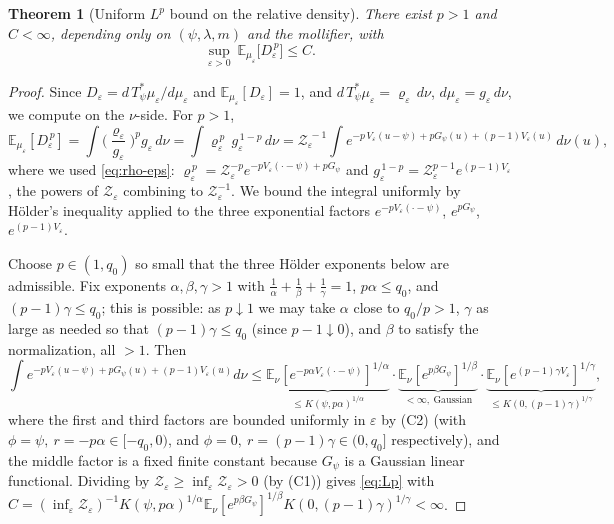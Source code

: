 \documentclass[12pt]{article}
\newcommand{\bE}{\mathbb{E}}
\newcommand{\eps}{\varepsilon}
\theoremstyle{plain}
\newtheorem{theorem}{Theorem}
\theoremstyle{definition}
\begin{document}
\begin{theorem}[Uniform $L^p$ bound on the relative density]\label{thm:Lp}
There exist $p>1$ and $C<\infty$, depending only on $(\psi,\lambda,m)$ and the
mollifier, with
\begin{equation}\label{eq:Lp}
\sup_{\eps>0}\ \bE_{\mu_\eps}\!\big[D_\eps^{\,p}\big]\le C .
\end{equation}
\end{theorem}

\begin{proof}
Since $D_\eps=d\,T_\psi^\ast\mu_\eps/d\mu_\eps$ and $\bE_{\mu_\eps}[D_\eps]=1$, and
$d\,T_\psi^\ast\mu_\eps=\varrho_\eps\,d\nu$, $d\mu_\eps=g_\eps\,d\nu$, we compute on the
$\nu$-side. For $p>1$,
\begin{equation}\label{eq:Lp-nu}
\bE_{\mu_\eps}[D_\eps^{\,p}]
=\int\Big(\frac{\varrho_\eps}{g_\eps}\Big)^{p}g_\eps\,d\nu
=\int\varrho_\eps^{\,p}\,g_\eps^{\,1-p}\,d\nu
=\mathcal Z_\eps^{\,-1}\int e^{-p\,V_\eps(u-\psi)+pG_\psi(u)+(p-1)V_\eps(u)}\,d\nu(u),
\end{equation}
where we used \eqref{eq:rho-eps}: $\varrho_\eps^{\,p}=\mathcal Z_\eps^{-p}e^{-pV_\eps(\cdot-\psi)+pG_\psi}$
and $g_\eps^{\,1-p}=\mathcal Z_\eps^{p-1}e^{(p-1)V_\eps}$, the powers of $\mathcal Z_\eps$
combining to $\mathcal Z_\eps^{-1}$. We bound the integral uniformly by H\"older's
inequality applied to the three exponential factors
$e^{-pV_\eps(\cdot-\psi)}$, $e^{pG_\psi}$, $e^{(p-1)V_\eps}$.

Choose $p\in(1,q_0)$ so small that the three H\"older exponents below are admissible.
Fix exponents $\alpha,\beta,\gamma>1$ with $\tfrac1\alpha+\tfrac1\beta+\tfrac1\gamma=1$,
$p\alpha\le q_0$, and $(p-1)\gamma\le q_0$; this is possible: as $p\downarrow1$ we may
take $\alpha$ close to $q_0/p>1$, $\gamma$ as large as needed so that
$(p-1)\gamma\le q_0$ (since $p-1\downarrow0$), and $\beta$ to satisfy the normalization,
all $>1$. Then
\[
\int e^{-pV_\eps(u-\psi)+pG_\psi(u)+(p-1)V_\eps(u)}d\nu
\le
\underbrace{\bE_\nu[e^{-p\alpha V_\eps(\cdot-\psi)}]^{1/\alpha}}_{\le K(\psi,p\alpha)^{1/\alpha}}
\cdot
\underbrace{\bE_\nu[e^{p\beta G_\psi}]^{1/\beta}}_{<\infty,\ \text{Gaussian}}
\cdot
\underbrace{\bE_\nu[e^{(p-1)\gamma V_\eps}]^{1/\gamma}}_{\le K(0,(p-1)\gamma)^{1/\gamma}},
\]
where the first and third factors are bounded uniformly in $\eps$ by (C2) (with
$\phi=\psi,\ r=-p\alpha\in[-q_0,0)$, and $\phi=0,\ r=(p-1)\gamma\in(0,q_0]$
respectively), and the middle factor is a fixed finite constant because $G_\psi$ is a
Gaussian linear functional. Dividing by $\mathcal Z_\eps\ge\inf_\eps\mathcal Z_\eps>0$
(by (C1)) gives \eqref{eq:Lp} with
$C=(\inf_\eps\mathcal Z_\eps)^{-1}K(\psi,p\alpha)^{1/\alpha}\bE_\nu[e^{p\beta G_\psi}]^{1/\beta}K(0,(p-1)\gamma)^{1/\gamma}<\infty$.
\end{proof}
\end{document}
